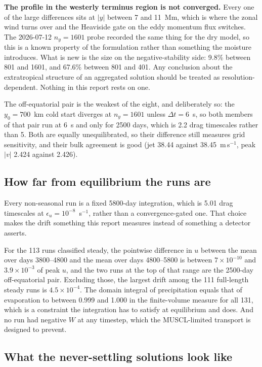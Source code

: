 \documentclass[11pt]{article}
\newcommand{\ms}{m\,s$^{-1}$}
\begin{document}
\textbf{The profile in the westerly terminus region is not converged.} Every one
of the large differences sits at $|y|$ between 7 and 11~Mm, which is where the
zonal wind turns over and the Heaviside gate on the eddy momentum flux switches.
The 2026-07-12 $n_y = 1601$ probe recorded the same thing for the dry model, so
this is a known property of the formulation rather than something the moisture
introduces. What is new is the size on the negative-stability side: 9.8\% between
801 and 1601, and 67.6\% between 801 and 401. Any conclusion about the
extratropical structure of an aggregated solution should be treated as
resolution-dependent. Nothing in this report rests on one.

The off-equatorial pair is the weakest of the eight, and deliberately so: the
$y_0 = 700$~km cold start diverges at $n_y = 1601$ unless $\Delta t = 6$~s, so
both members of that pair run at 6~s and only for 2500 days, which is 2.2 drag
timescales rather than 5. Both are equally unequilibrated, so their difference
still measures grid sensitivity, and their bulk agreement is good (jet 38.44
against 38.45~\ms, peak $|v|$ 2.424 against 2.426).

\subsection{How far from equilibrium the runs are}

Every non-seasonal run is a fixed 5800-day integration, which is 5.01 drag
timescales at $\epsilon_u = 10^{-8}$~s$^{-1}$, rather than a convergence-gated
one. That choice makes the drift something this report measures instead of
something a detector asserts.

For the 113 runs classified steady, the pointwise difference in $u$ between the
mean over days 3800--4800 and the mean over days 4800--5800 is between
$7\times10^{-10}$ and $3.9\times10^{-3}$ of peak $u$, and the two runs at the top
of that range are the 2500-day off-equatorial pair. Excluding those, the largest
drift among the 111 full-length steady runs is $4.5\times10^{-4}$. The domain
integral of
precipitation equals that of evaporation to between 0.999 and 1.000 in the
finite-volume measure for all 131, which is a constraint the integration has to
satisfy at equilibrium and does. And no run had negative $W$ at any timestep,
which the MUSCL-limited transport is designed to prevent.

\subsection{What the never-settling solutions look like}
\end{document}
